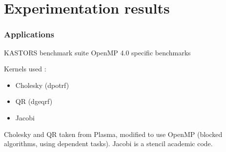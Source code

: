 \documentclass[xcolor={usenames,dvipsnames,svgnames,table}, aspectratio=43]{beamer}
\begin{document}
\section{Experimentation results}


\begin{frame}
\frametitle{Applications}

\begin{block}{KASTORS benchmark suite}
  OpenMP 4.0 specific benchmarks

  Kernels used :
  \begin{itemize}
    \item Cholesky (dpotrf)
    \item QR (dgeqrf)
    \item Jacobi
  \end{itemize}

  Cholesky and QR taken from Plasma, modified to use OpenMP (blocked algorithms, using dependent tasks).
  Jacobi is a stencil academic code.
\end{block}

\end{frame}
\end{document}
